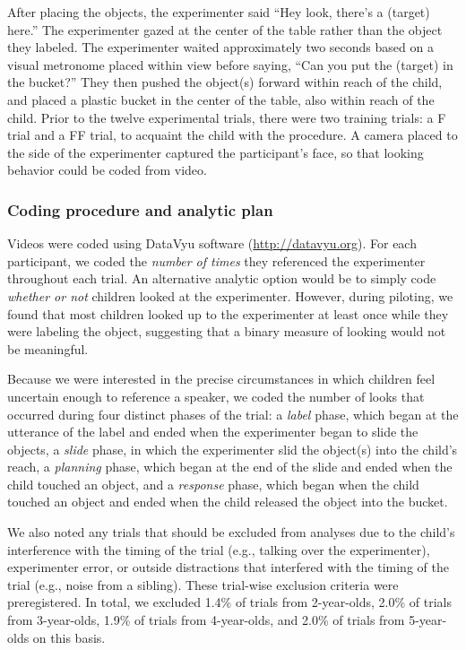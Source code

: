 \documentclass[a4paper,man,apacite,floatsintext]{apa6}
\begin{document}
After placing the objects, the experimenter said ``Hey look, there's a
(target) here.'' The experimenter gazed at the center of the table
rather than the object they labeled. The experimenter waited
approximately two seconds based on a visual metronome placed within view
before saying, ``Can you put the (target) in the bucket?'' They then
pushed the object(s) forward within reach of the child, and placed a
plastic bucket in the center of the table, also within reach of the
child. Prior to the twelve experimental trials, there were two training
trials: a F trial and a FF trial, to acquaint the child with the
procedure. A camera placed to the side of the experimenter captured the
participant's face, so that looking behavior could be coded from video.

\subsubsection{Coding procedure and analytic
plan}\label{coding-procedure-and-analytic-plan}

Videos were coded using DataVyu software (\url{http://datavyu.org}). For
each participant, we coded the \emph{number of times} they referenced
the experimenter throughout each trial. An alternative analytic option
would be to simply code \emph{whether or not} children looked at the
experimenter. However, during piloting, we found that most children
looked up to the experimenter at least once while they were labeling the
object, suggesting that a binary measure of looking would not be
meaningful.

Because we were interested in the precise circumstances in which
children feel uncertain enough to reference a speaker, we coded the
number of looks that occurred during four distinct phases of the trial:
a \emph{label} phase, which began at the utterance of the label and
ended when the experimenter began to slide the objects, a \emph{slide}
phase, in which the experimenter slid the object(s) into the child's
reach, a \emph{planning} phase, which began at the end of the slide and
ended when the child touched an object, and a \emph{response} phase,
which began when the child touched an object and ended when the child
released the object into the bucket.

We also noted any trials that should be excluded from analyses due to
the child's interference with the timing of the trial (e.g., talking
over the experimenter), experimenter error, or outside distractions that
interfered with the timing of the trial (e.g., noise from a sibling).
These trial-wise exclusion criteria were preregistered. In total, we
excluded 1.4\% of trials from 2-year-olds, 2.0\% of trials from
3-year-olds, 1.9\% of trials from 4-year-olds, and 2.0\% of trials from
5-year-olds on this basis.
\end{document}
